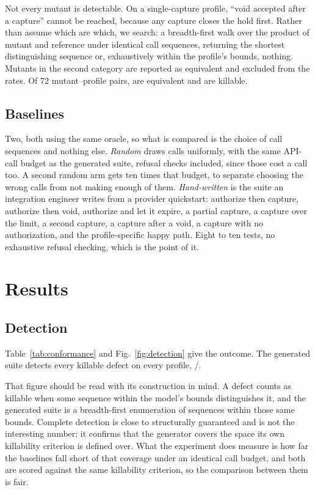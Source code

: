 \documentclass[conference]{IEEEtran}
\begin{document}
Not every mutant is detectable. On a single-capture profile, ``void accepted
after a capture'' cannot be reached, because any capture closes the hold first.
Rather than assume which are which, we search: a breadth-first walk over the
product of mutant and reference under identical call sequences, returning the
shortest distinguishing sequence or, exhaustively within the profile's bounds,
nothing. Mutants in the second category are reported as equivalent and excluded
from the rates. Of 72 mutant--profile pairs, \equivmutants{} are equivalent and
\killablemutants{} are killable.

\subsection{Baselines}

Two, both using the same oracle, so what is compared is the choice of call
sequences and nothing else. \emph{Random} draws calls uniformly, with the same
API-call budget as the generated suite, refusal checks included, since those
cost a call too. A second random arm gets ten times that budget, to separate
choosing the wrong calls from not making enough of them. \emph{Hand-written} is
the suite an integration engineer writes from a provider quickstart: authorize
then capture, authorize then void, authorize and let it expire, a partial
capture, a capture over the limit, a second capture, a capture after a void, a
capture with no authorization, and the profile-specific happy path. Eight to ten
tests, no exhaustive refusal checking, which is the point of it.

\section{Results}
\label{sec:results}

\subsection{Detection}

Table~\ref{tab:conformance} and Fig.~\ref{fig:detection} give the outcome. The
generated suite detects every killable defect on every profile,
\modeldetected{}/\killablemutants{}.

That figure should be read with its construction in mind. A defect counts as
killable when some sequence within the model's bounds distinguishes it, and the
generated suite is a breadth-first enumeration of sequences within those same
bounds. Complete detection is close to structurally guaranteed and is not the
interesting number; it confirms that the generator covers the space its own
killability criterion is defined over. What the experiment does measure is how
far the baselines fall short of that coverage under an identical call budget,
and both are scored against the same killability criterion, so the comparison
between them is fair.
\end{document}
